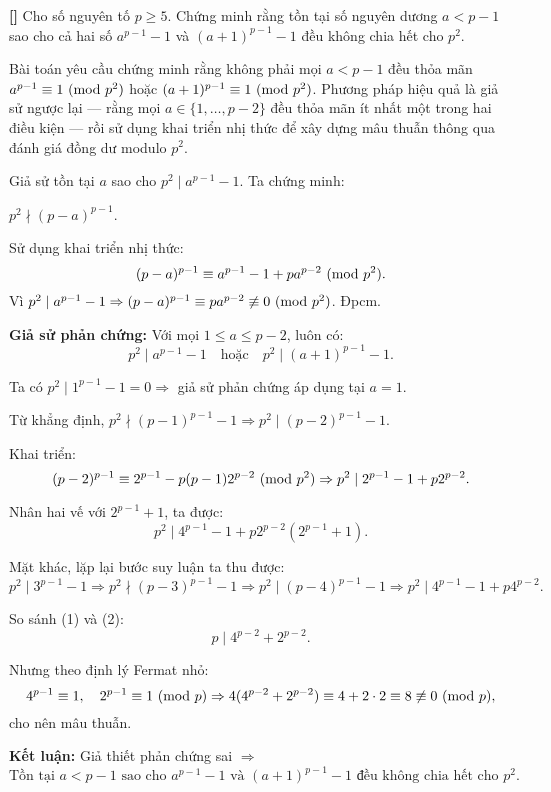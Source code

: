 \documentclass[../05-modular-arithmetic-a.tex]{subfiles}
\begin{document}
\begin{example*}\label{example:RUS-2015-D7-P5}\textbf{[]}
	Cho số nguyên tố \( p \ge 5 \). Chứng minh rằng tồn tại số nguyên dương \( a < p - 1 \) sao cho cả hai số \( a^{p-1} - 1 \) và \( (a+1)^{p-1} - 1 \) đều không chia hết cho \( p^2 \).
\end{example*}

\begin{story*}
    Bài toán yêu cầu chứng minh rằng không phải mọi \( a < p - 1 \) đều thỏa mãn \( a^{p-1} \equiv 1 \ (\mathrm{mod}\ p^2) \) hoặc \( (a+1)^{p-1} \equiv 1 \ (\mathrm{mod}\ p^2) \).  
    Phương pháp hiệu quả là giả sử ngược lại — rằng mọi \( a \in \{1, \dots, p - 2\} \) đều thỏa mãn ít nhất một trong hai điều kiện — rồi sử dụng khai triển nhị thức để xây dựng mâu thuẫn thông qua đánh giá đồng dư modulo \( p^2 \).
\end{story*}

\bigbreak

\begin{soln}\footnotemark
	Giả sử tồn tại \( a \) sao cho \( p^2 \mid a^{p-1} - 1 \). Ta chứng minh:
	\begin{claim*}
		\( p^2 \nmid (p - a)^{p-1} \).
	\end{claim*}
	\begin{subproof}
		Sử dụng khai triển nhị thức:
		\[
			(p - a)^{p-1} \equiv a^{p-1} - 1 + pa^{p-2} \ (\mathrm{mod}\ p^2).
		\]
		Vì \( p^2 \mid a^{p-1} - 1 \Rightarrow (p - a)^{p-1} \equiv pa^{p-2} \not\equiv 0 \ (\mathrm{mod}\ p^2) \). Đpcm.
	\end{subproof}

	\textbf{Giả sử phản chứng:} Với mọi \( 1 \le a \le p - 2 \), luôn có:
	\[
		p^2 \mid a^{p-1} - 1 \quad \text{hoặc} \quad p^2 \mid (a+1)^{p-1} - 1.
	\]

	Ta có \( p^2 \mid 1^{p-1} - 1 = 0 \Rightarrow \) giả sử phản chứng áp dụng tại \( a = 1 \).

	Từ khẳng định, \( p^2 \nmid (p-1)^{p-1} - 1 \Rightarrow p^2 \mid (p - 2)^{p-1} - 1 \).

	Khai triển:
	\[
		(p - 2)^{p-1} \equiv 2^{p-1} - p(p-1)2^{p-2} \ (\mathrm{mod}\ p^2)
	\Rightarrow p^2 \mid 2^{p-1} - 1 + p2^{p-2}.
	\]

	Nhân hai vế với \( 2^{p-1} + 1 \), ta được:
	\[
		p^2 \mid 4^{p-1} - 1 + p2^{p-2}(2^{p-1} + 1). \tag{1}
	\]

	Mặt khác, lặp lại bước suy luận ta thu được:
	\[
		p^2 \mid 3^{p-1} - 1 \Rightarrow p^2 \nmid (p - 3)^{p-1} - 1 \Rightarrow p^2 \mid (p - 4)^{p-1} - 1
	\Rightarrow p^2 \mid 4^{p-1} - 1 + p4^{p-2}. \tag{2}
	\]

	So sánh (1) và (2):
	\[
		p \mid 4^{p-2} + 2^{p-2}.
	\]

	Nhưng theo định lý Fermat nhỏ:
	\[
		4^{p-1} \equiv 1,\quad 2^{p-1} \equiv 1 \ (\mathrm{mod}\ p)
	\Rightarrow 4(4^{p-2} + 2^{p-2}) \equiv 4 + 2 \cdot 2 \equiv 8 \not\equiv 0 \ (\mathrm{mod}\ p),
	\]
	cho nên mâu thuẫn.

	\textbf{Kết luận:} Giả thiết phản chứng sai \( \Rightarrow \)
	\[
		\boxed{\text{Tồn tại } a < p - 1 \text{ sao cho } a^{p-1} - 1 \text{ và } (a+1)^{p-1} - 1 \text{ đều không chia hết cho } p^2.}
	\]
\end{soln}

\end{document}
